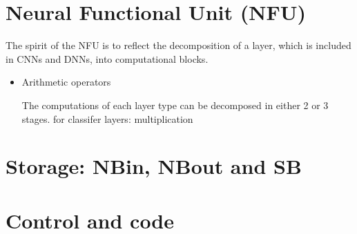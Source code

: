 \documentclass[10pt]{article}
\begin{document}
    \section{Neural Functional Unit (NFU)}
    The spirit of the NFU is to reflect the decomposition of a layer,
    which is included in CNNs and DNNs, into computational blocks.
    \begin{itemize}
        \item Arithmetic operators

        The computations of each layer type can be decomposed in
        either 2 or 3 stages. for classifer layers: multiplication
    \end{itemize}
    \section{Storage: NBin, NBout and SB}
    \section{Control and code}
\end{document}
